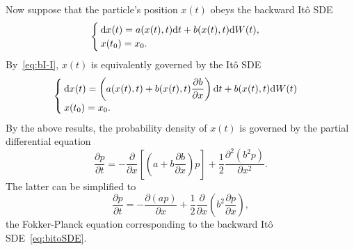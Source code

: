 Now suppose that the particle's position $x(t)$ obeys the backward Itô SDE
\begin{equation} \label{eq:bitoSDE}
	\begin{cases}
		\rm dx(t) = a(x(t),t) \rm dt + b(x(t),t) \rm dW(t),\\
		x(t_0) = x_0. 
	\end{cases}
\end{equation}
By~\eqref{eq:bI-I}, $x(t)$ is equivalently governed by the Itô SDE
\begin{equation} \label{eq:biSDE-i}
	\begin{cases}
		\rm dx(t) = \left(a(x(t),t)+b(x(t),t)\dfrac{\partial b}{\partial x}\right)\rm dt + b(x(t),t) \rm dW(t)\\
		x(t_0) = x_0. 
	\end{cases}
\end{equation}
By the above results, the probability density of $x(t)$ is governed by the partial differential equation
\begin{equation}
	\frac{\partial p}{\partial t} = - \frac{\partial}{\partial x}\left[\left(a+b\dfrac{\partial b}{\partial x}\right)p\right] + \frac{1}{2}\frac{\partial^2 (b^2 p)}{\partial x^2}.
\end{equation}
The latter can be simplified to
\begin{equation}
	\frac{\partial p}{\partial t} = - \frac{\partial(ap)}{\partial x} + \frac{1}{2}\frac{\partial}{\partial x}\left(b^2 \frac{\partial p}{\partial x} \right),
\end{equation}
the Fokker-Planck equation corresponding to the backward Itô SDE~\eqref{eq:bitoSDE}.

